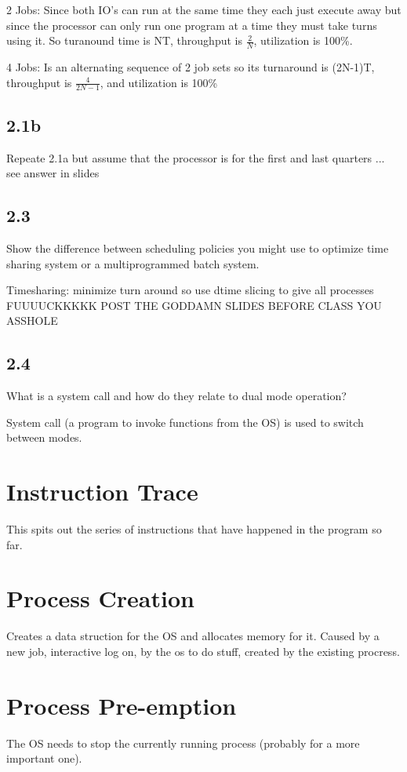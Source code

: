 \documentclass[12pt]{article}
\begin{document}
2 Jobs: Since both IO's can run at the same time they each just execute away but since the processor can only run one program at a time they must take turns using it. So turanound time is NT, throughput is $\frac{2}{N}$, utilization is 100\%.

4 Jobs: Is an alternating sequence of 2 job sets so its turnaround is (2N-1)T, throughput is $\frac{4}{2N-1}$, and utilization is 100\%

\subsection{2.1b}
Repeate 2.1a but assume that the processor is for the first and last quarters ... see answer in slides


\subsection{2.3}
Show the difference between scheduling policies you might use to optimize time sharing system or a multiprogrammed batch system.

Timesharing: minimize turn around so use dtime slicing to give all processes
FUUUUCKKKKK POST THE GODDAMN SLIDES BEFORE CLASS YOU ASSHOLE


\subsection{2.4}
What is a system call and how do they relate to dual mode operation?

System call (a program to invoke functions from the OS) is used to switch between modes.

\section{Instruction Trace}
This spits out the series of instructions that have happened in the program so far.

\section{Process Creation}
Creates a data struction for the OS and allocates memory for it. Caused by a new job, interactive log on, by the os to do stuff, created by the existing procress.

\section{Process Pre-emption}
The OS needs to stop the currently running process (probably for a more important one).
\end{document}
